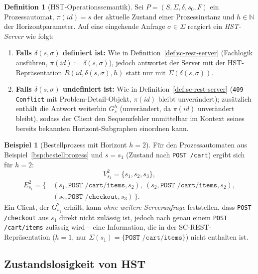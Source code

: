 ﻿\documentclass[a4paper,12pt]{article}
\theoremstyle{definition}
\newtheorem{definition}{Definition}
\newtheorem{beispiel}{Beispiel}
\begin{document}
\begin{definition}[HST-Operationssemantik]
	\label{def:hst-server}
	Sei $P=(S,\Sigma,\delta,s_0,F)$ ein Prozessautomat, $\pi(id)=s$ der aktuelle Zustand
	einer Prozessinstanz und $h\in\mathbb{N}$ der Horizontparameter. Auf eine eingehende
	Anfrage $\sigma\in\Sigma$ reagiert ein \emph{HST-Server} wie folgt:
	\begin{enumerate}
		\item \textbf{Falls $\delta(s,\sigma)$ definiert ist:} Wie in
		Definition~\ref{def:sc-rest-server} (Fachlogik ausführen, $\pi(id):=
		\delta(s,\sigma)$), jedoch antwortet der Server mit der HST-Repräsentation
		$R(id,\delta(s,\sigma),h)$ statt nur mit $\Sigma(\delta(s,\sigma))$.
		\item \textbf{Falls $\delta(s,\sigma)$ undefiniert ist:} Wie in
		Definition~\ref{def:sc-rest-server} (\texttt{409 Conflict} mit
		Problem-Detail-Objekt, $\pi(id)$ bleibt unverändert); zusätzlich enthält die
		Antwort weiterhin $G_s^h$ (unverändert, da $\pi(id)$ unverändert bleibt), sodass
		der Client den Sequenzfehler unmittelbar im Kontext seines bereits bekannten
		Horizont-Subgraphen einordnen kann.
	\end{enumerate}
\end{definition}

\begin{beispiel}[Bestellprozess mit Horizont $h=2$]
	\label{bsp:hst-bestellprozess}
	Für den Prozessautomaten aus Beispiel~\ref{bsp:bestellprozess} und $s=s_1$ (Zustand
	nach \texttt{POST /cart}) ergibt sich für $h=2$:
	\[
		V_{s_1}^2 = \{s_1,s_2,s_3\},
	\]
	\[
		\begin{aligned}
			E_{s_1}^2 = \bigl\{\, &(s_1,\texttt{POST /cart/items},s_2),\
				(s_2,\texttt{POST /cart/items},s_2),\\
				&(s_2,\texttt{POST /checkout},s_3) \,\bigr\}.
		\end{aligned}
	\]
	Ein Client, der $G_{s_1}^2$ erhält, kann \emph{ohne weitere Serveranfrage}
	feststellen, dass \texttt{POST /checkout} aus $s_1$ direkt nicht zulässig ist, jedoch
	nach genau einem \texttt{POST /cart/items} zulässig wird -- eine Information, die in
	der SC-REST-Repräsentation ($h=1$, nur $\Sigma(s_1)=\{\texttt{POST /cart/items}\}$)
	nicht enthalten ist.
\end{beispiel}

\subsection{Zustandslosigkeit von HST}
\label{sec:hst-zustandslosigkeit}
\end{document}
